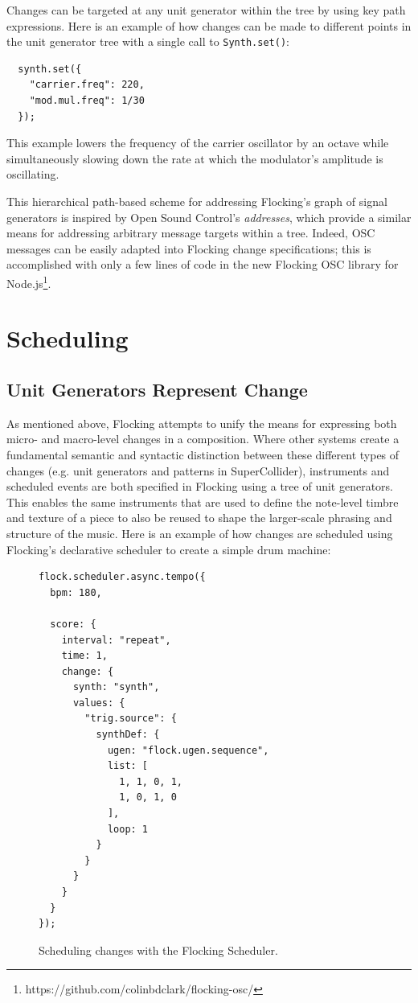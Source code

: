 \documentclass{article}
\begin{document}
Changes can be targeted at any unit generator within the tree by using key path expressions. Here is an example of how changes can be made to different points in the unit generator tree with a single call to \verb|Synth.set()|:

\begin{verbatim}
  synth.set({
    "carrier.freq": 220,
    "mod.mul.freq": 1/30
  });
\end{verbatim}

This example lowers the frequency of the carrier oscillator by an octave while simultaneously slowing down the rate at which the modulator's amplitude is oscillating.

This hierarchical path-based scheme for addressing Flocking's graph of signal generators is inspired by Open Sound Control's {\it addresses}, which provide a similar means for addressing arbitrary message targets within a tree. Indeed, OSC messages can be easily adapted into Flocking change specifications; this is accomplished with only a few lines of code in the new Flocking OSC library for Node.js\footnote{https://github.com/colinbdclark/flocking-osc/}.

\section{Scheduling} \label{sec:Scheduling}

\subsection{Unit Generators Represent Change}

As mentioned above, Flocking attempts to unify the means for expressing both micro- and macro-level changes in a composition. Where other systems create a fundamental semantic and syntactic distinction between these different types of changes (e.g. unit generators and patterns in SuperCollider), instruments and scheduled events are both specified in Flocking using a tree of unit generators. This enables the same instruments that are used to define the note-level timbre and texture of a piece to also be reused to shape the larger-scale phrasing and structure of the music. Here is an example of how changes are scheduled using Flocking's declarative scheduler to create a simple drum machine:

\begin{figure}[h!]
    \begin{verbatim}
flock.scheduler.async.tempo({
  bpm: 180,

  score: {
    interval: "repeat",
    time: 1,
    change: {
      synth: "synth",
      values: {
        "trig.source": {
          synthDef: {
            ugen: "flock.ugen.sequence",
            list: [
              1, 1, 0, 1,
              1, 0, 1, 0
            ],
            loop: 1
          }
        }
      }
    }
  }
});
    \end{verbatim}
    \caption{Scheduling changes with the Flocking Scheduler.\label{fig:schedulerEx}}
\end{figure}
\end{document}
